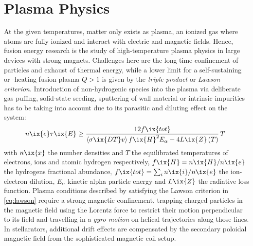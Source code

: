     \section{Plasma Physics}\label{sec:plasmaphysics}%
%
        At the given temperatures, matter only exists as plasma, an ionized gas where atoms are fully ionized and interact with electric and magnetic fields. Hence, fusion energy research is the study of high-temperature plasma physics in large devices with strong magnets. Challenges here are the long-time confinement of particles and exhaust of thermal energy, while a lower limit for a self-sustaining or -heating fusion plasma $Q>1$ is given by the \textit{triple product} or \textit{Lawson criterion}. Introduction of non-hydrogenic species into the plasma via deliberate gas puffing, solid-state seeding, sputtering of wall material or intrinsic impurities has to be taking into account due to its parasitic and diluting effect on the system:%
%
        \begin{align}%
            n\ix{e}\tau\ix{E}\ge\frac{12f\ix{tot}}{\left\langle\sigma\ix{DT}v\right\rangle f\ix{H}^{2}E_{\alpha}-4L\ix{Z}\left(T\right)}\,T\,\,\label{eq:lawson}%
        \end{align}%
%
        with $n\ix{x}$ the number densities and $T$ the equilibrated temperatures of electrons, ions and atomic hydrogen respectively, $f\ix{H}=n\ix{H}/n\ix{e}$ the hydrogens fractional abundance, $f\ix{tot}=\sum_{i}n\ix{i}/n\ix{e}$ the ion-electron dilution, $E_{\alpha}$ kinetic alpha particle energy and $L\ix{Z}$ the radiative loss function. Plasma conditions described by satisfying the Lawson criterion in \cref{eq:lawson} require a strong magnetic confinement, trapping charged particles in the magnetic field using
        the Lorentz force to restrict their motion perpendicular to its field and travelling in a \textit{gyro-motion} on helical trajectories along those lines. In stellarators, additional drift effects are compensated by the secondary poloidal magnetic field from the sophisticated magnetic coil setup\cite{Helander2014,Boozer2015}.\\%
